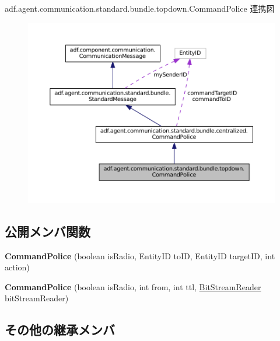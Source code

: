 adf.\+agent.\+communication.\+standard.\+bundle.\+topdown.\+Command\+Police 連携図
\nopagebreak
\begin{figure}[H]
\begin{center}
\leavevmode
\includegraphics[width=350pt]{classadf_1_1agent_1_1communication_1_1standard_1_1bundle_1_1topdown_1_1CommandPolice__coll__graph}
\end{center}
\end{figure}
\subsection*{公開メンバ関数}
\begin{DoxyCompactItemize}
\item 
\hypertarget{classadf_1_1agent_1_1communication_1_1standard_1_1bundle_1_1topdown_1_1CommandPolice_aa8cda9c94c7876cbd37c15925411aa23}{}\label{classadf_1_1agent_1_1communication_1_1standard_1_1bundle_1_1topdown_1_1CommandPolice_aa8cda9c94c7876cbd37c15925411aa23} 
{\bfseries Command\+Police} (boolean is\+Radio, Entity\+ID to\+ID, Entity\+ID target\+ID, int action)
\item 
\hypertarget{classadf_1_1agent_1_1communication_1_1standard_1_1bundle_1_1topdown_1_1CommandPolice_afdeb2bff9db87a9436ffb6171a437a16}{}\label{classadf_1_1agent_1_1communication_1_1standard_1_1bundle_1_1topdown_1_1CommandPolice_afdeb2bff9db87a9436ffb6171a437a16} 
{\bfseries Command\+Police} (boolean is\+Radio, int from, int ttl, \hyperlink{classadf_1_1component_1_1communication_1_1util_1_1BitStreamReader}{Bit\+Stream\+Reader} bit\+Stream\+Reader)
\end{DoxyCompactItemize}
\subsection*{その他の継承メンバ}


